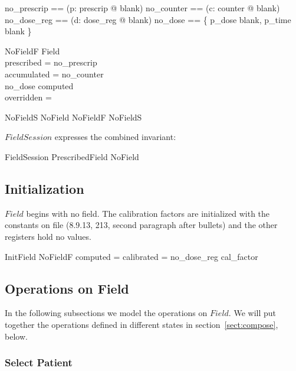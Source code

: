 \begin{zed}
	no\_prescrip == (\lambda p: prescrip @ blank)
\also
	no\_counter == (\lambda c: counter @ blank)
\also
	no\_dose\_reg == (\lambda d: dose\_reg @ blank)
\also
	no\_dose == \{ p\_dose \mapsto blank, p\_time \mapsto blank \} 
\end{zed}

\begin{schema}{NoFieldF}
	Field \\
\where
	prescribed = no\_prescrip \\
	accumulated = no\_counter \\
	no\_dose \subseteq computed \\
	overridden = \emptyset \\
\end{schema}

\begin{zed}
	NoFieldS 
\also
	NoField  NoFieldF \land NoFieldS
\end{zed}
$FieldSession$ expresses the combined invariant:

\begin{zed}
FieldSession  PrescribedField \lor NoField
\end{zed}

\subsection{Initialization}

$Field$ begins with no field.  The calibration factors
are initialized with the constants on file (8.9.13, 213, second
paragraph after bullets) and the other registers hold no values.

\begin{schema}{InitField}
	NoFieldF
\where
	computed = calibrated = no\_dose\_reg \oplus cal\_factor
\end{schema}

\subsection{Operations on Field}

In the following subsections we model the operations on $Field$.  We
will put together the operations defined in different states in
section~\ref{sect:compose}, below.

\subsubsection{Select Patient}

